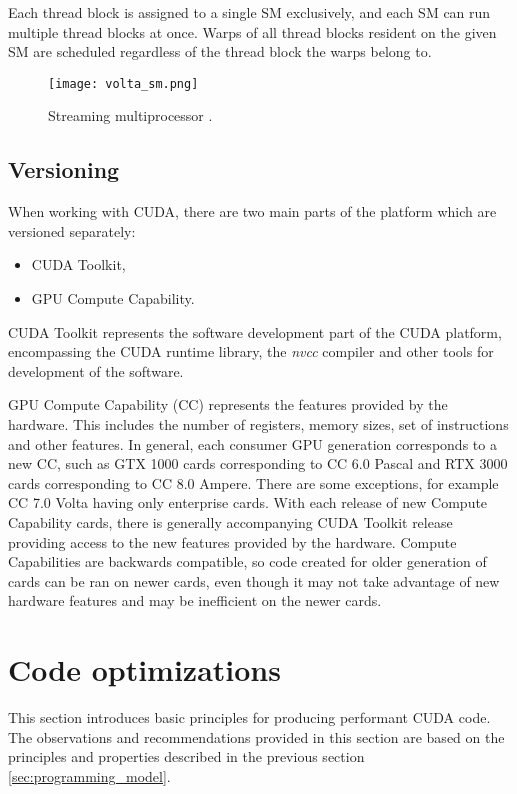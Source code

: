 Each thread block is assigned to a single SM exclusively, and each SM can run multiple thread blocks at once. Warps of all thread blocks resident on the given SM are scheduled regardless of the thread block the warps belong to.


\begin{figure}[h]
	\centering
	\texttt{[image: volta\_sm.png]}
	\caption{Streaming multiprocessor \citep{paper:volta}.}
	\label{fig:volta_sm}
\end{figure}

\subsection{Versioning}

When working with CUDA, there are two main parts of the platform which are versioned separately: %
\begin{itemize}
	\item CUDA Toolkit,
	\item GPU Compute Capability.
\end{itemize}

CUDA Toolkit represents the software development part of the CUDA platform, encompassing the CUDA runtime library, the \textit{nvcc} compiler and other tools for development of the software.

GPU Compute Capability (CC) represents the features provided by the hardware. This includes the number of registers, memory sizes, set of instructions and other features. In general, each consumer GPU generation corresponds to a new CC, such as GTX 1000 cards corresponding to CC 6.0 Pascal and RTX 3000 cards corresponding to CC 8.0 Ampere. There are some exceptions, for example CC 7.0 Volta having only enterprise cards. With each release of new Compute Capability cards, there is generally accompanying CUDA Toolkit release providing access to the new features provided by the hardware. Compute Capabilities are backwards compatible, so code created for older generation of cards can be ran on newer cards, even though it may not take advantage of new hardware features and may be inefficient on the newer cards.

\section{Code optimizations}

This section introduces basic principles for producing performant CUDA code.
The observations and recommendations provided in this section are based on the principles and properties described in the previous section \ref{sec:programming_model}.

